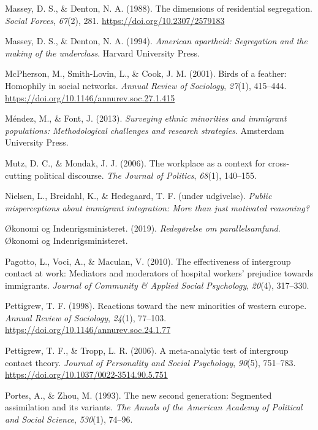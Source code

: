 \documentclass[
]{book}
\newlength{\cslhangindent}
\newenvironment{CSLReferences}[2] %
 {\begin{list}{}{%
  \setlength{\itemindent}{0pt}
  \setlength{\leftmargin}{0pt}
  \setlength{\parsep}{0pt}
  \ifodd #1
   \setlength{\leftmargin}{\cslhangindent}
   \setlength{\itemindent}{-1\cslhangindent}
  \fi
  \setlength{\itemsep}{#2\baselineskip}}}
 {\end{list}}
\begin{document}
\begin{CSLReferences}{1}{0}
Massey, D. S., \& Denton, N. A. (1988). The dimensions of residential segregation. \emph{Social Forces}, \emph{67}(2), 281. \url{https://doi.org/10.2307/2579183}

Massey, D. S., \& Denton, N. A. (1994). \emph{American apartheid: Segregation and the making of the underclass}. Harvard University Press.

McPherson, M., Smith-Lovin, L., \& Cook, J. M. (2001). Birds of a feather: Homophily in social networks. \emph{Annual Review of Sociology}, \emph{27}(1), 415--444. \url{https://doi.org/10.1146/annurev.soc.27.1.415}

Méndez, M., \& Font, J. (2013). \emph{Surveying ethnic minorities and immigrant populations: Methodological challenges and research strategies}. Amsterdam University Press.

Mutz, D. C., \& Mondak, J. J. (2006). The workplace as a context for cross-cutting political discourse. \emph{The Journal of Politics}, \emph{68}(1), 140--155.

Nielsen, L., Breidahl, K., \& Hedegaard, T. F. (under udgivelse). \emph{Public misperceptions about immigrant integration: More than just motivated reasoning?}

Økonomi og Indenrigsministeret. (2019). \emph{Redegørelse om parallelsamfund}. {Økonomi og Indenrigsministeret}.

Pagotto, L., Voci, A., \& Maculan, V. (2010). The effectiveness of intergroup contact at work: Mediators and moderators of hospital workers' prejudice towards immigrants. \emph{Journal of Community \& Applied Social Psychology}, \emph{20}(4), 317--330.

Pettigrew, T. F. (1998). Reactions toward the new minorities of western europe. \emph{Annual Review of Sociology}, \emph{24}(1), 77--103. \url{https://doi.org/10.1146/annurev.soc.24.1.77}

Pettigrew, T. F., \& Tropp, L. R. (2006). A meta-analytic test of intergroup contact theory. \emph{Journal of Personality and Social Psychology}, \emph{90}(5), 751--783. \url{https://doi.org/10.1037/0022-3514.90.5.751}

Portes, A., \& Zhou, M. (1993). The new second generation: Segmented assimilation and its variants. \emph{The Annals of the American Academy of Political and Social Science}, \emph{530}(1), 74--96.


\end{CSLReferences}
\end{document}
